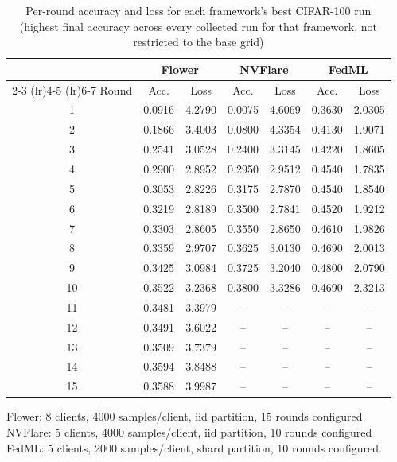 \begin{table}[htbp]
\centering
\caption{Per-round accuracy and loss for each framework's best CIFAR-100 run (highest final accuracy across every collected run for that framework, not restricted to the base grid)}
\label{tab:convergence-cifar100}
\begin{tabular}{c cc cc cc}
\toprule
 & \multicolumn{2}{c}{Flower} & \multicolumn{2}{c}{NVFlare} & \multicolumn{2}{c}{FedML} \\
\cmidrule(lr){2-3} \cmidrule(lr){4-5} \cmidrule(lr){6-7}
Round & Acc. & Loss & Acc. & Loss & Acc. & Loss \\
\midrule
1 & 0.0916 & 4.2790 & 0.0075 & 4.6069 & 0.3630 & 2.0305 \\
2 & 0.1866 & 3.4003 & 0.0800 & 4.3354 & 0.4130 & 1.9071 \\
3 & 0.2541 & 3.0528 & 0.2400 & 3.3145 & 0.4220 & 1.8605 \\
4 & 0.2900 & 2.8952 & 0.2950 & 2.9512 & 0.4540 & 1.7835 \\
5 & 0.3053 & 2.8226 & 0.3175 & 2.7870 & 0.4540 & 1.8540 \\
6 & 0.3219 & 2.8189 & 0.3500 & 2.7841 & 0.4520 & 1.9212 \\
7 & 0.3303 & 2.8605 & 0.3550 & 2.8650 & 0.4610 & 1.9826 \\
8 & 0.3359 & 2.9707 & 0.3625 & 3.0130 & 0.4690 & 2.0013 \\
9 & 0.3425 & 3.0984 & 0.3725 & 3.2040 & 0.4800 & 2.0790 \\
10 & 0.3522 & 3.2368 & 0.3800 & 3.3286 & 0.4690 & 2.3213 \\
11 & 0.3481 & 3.3979 & -- & -- & -- & -- \\
12 & 0.3491 & 3.6022 & -- & -- & -- & -- \\
13 & 0.3509 & 3.7379 & -- & -- & -- & -- \\
14 & 0.3594 & 3.8488 & -- & -- & -- & -- \\
15 & 0.3588 & 3.9987 & -- & -- & -- & -- \\
\bottomrule
\end{tabular}
\vspace{0.5em}
\footnotesize
Flower: 8 clients, 4000 samples/client, iid partition, 15 rounds configured\\ NVFlare: 5 clients, 4000 samples/client, iid partition, 10 rounds configured\\ FedML: 5 clients, 2000 samples/client, shard partition, 10 rounds configured.
\end{table}

